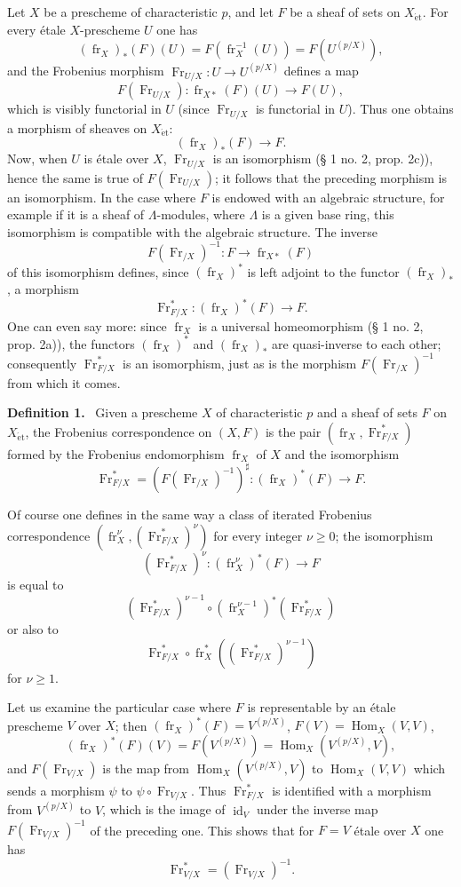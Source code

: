 \documentclass[11pt]{article}
\newenvironment{statement}[1]{\par\medskip\noindent\textbf{#1.}\ }{\par\medskip}
\DeclareMathOperator{\Hom}{Hom}
\providecommand{\et}{\mathrm{\acute{e}t}}
\providecommand{\id}{\operatorname{id}}
\providecommand{\Hom}{\operatorname{Hom}}
\providecommand{\id}{\operatorname{id}}
\providecommand{\id}{\operatorname{id}}
\providecommand{\id}{\operatorname{id}}
\providecommand{\id}{\operatorname{id}}
\providecommand{\Hom}{\operatorname{Hom}}
\providecommand{\fr}{\operatorname{fr}}
\providecommand{\Fr}{\operatorname{Fr}}
\providecommand{\Fr}{\operatorname{Fr}}
\providecommand{\fr}{\operatorname{fr}}
\providecommand{\id}{\operatorname{id}}
\providecommand{\et}{\acute{e}t}
\begin{document}
Let $X$ be a prescheme of characteristic $p$, and let $F$ be a sheaf of sets on $X_{\et}$. For every étale $X$-prescheme $U$ one has
\[
(\fr_X)_*(F)(U)=F(\fr_X^{-1}(U))=F(U^{(p/X)}),
\]
and the Frobenius morphism $\Fr_{U/X}:U\to U^{(p/X)}$ defines a map
\[
F(\Fr_{U/X}):\fr_{X*}(F)(U)\longrightarrow F(U),
\]
which is visibly functorial in $U$ (since $\Fr_{U/X}$ is functorial in $U$). Thus one obtains a morphism of sheaves on $X_{\et}$:
\[
(\fr_X)_*(F)\longrightarrow F.
\]
Now, when $U$ is étale over $X$, $\Fr_{U/X}$ is an isomorphism (§ 1 no. 2, prop. 2c)), hence the same is true of $F(\Fr_{U/X})$; it follows that the preceding morphism is an isomorphism. In the case where $F$ is endowed with an algebraic structure, for example if it is a sheaf of $\Lambda$-modules, where $\Lambda$ is a given base ring, this isomorphism is compatible with the algebraic structure. The inverse
\[
F(\Fr_{/X})^{-1}:F\longrightarrow \fr_{X*}(F)
\]
of this isomorphism defines, since $(\fr_X)^*$ is left adjoint to the functor $(\fr_X)_*$, a morphism
\[
\Fr^*_{F/X}:(\fr_X)^*(F)\longrightarrow F.
\]
One can even say more: since $\fr_X$ is a universal homeomorphism (§ 1 no. 2, prop. 2a)), the functors $(\fr_X)^*$ and $(\fr_X)_*$ are quasi-inverse to each other; consequently $\Fr^*_{F/X}$ is an isomorphism, just as is the morphism $F(\Fr_{/X})^{-1}$ from which it comes.

\begin{statement}{Definition 1}
Given a prescheme $X$ of characteristic $p$ and a sheaf of sets $F$ on $X_{\et}$, the Frobenius correspondence on $(X,F)$ is the pair $(\fr_X,\Fr^*_{F/X})$ formed by the Frobenius endomorphism $\fr_X$ of $X$ and the isomorphism
\[
\Fr^*_{F/X}=(F(\Fr_{/X})^{-1})^\sharp:(\fr_X)^*(F)\longrightarrow F.
\]
\end{statement}

Of course one defines in the same way a class of iterated Frobenius correspondence $(\fr_X^\nu,(\Fr^*_{F/X})^\nu)$ for every integer $\nu\geq0$; the isomorphism
\[
(\Fr^*_{F/X})^\nu:(\fr_X^\nu)^*(F)\longrightarrow F
\]
is equal to
\[
(\Fr^*_{F/X})^{\nu-1}\circ (\fr_X^{\nu-1})^*(\Fr^*_{F/X})
\]
or also to
\[
\Fr^*_{F/X}\circ\fr_X^*((\Fr^*_{F/X})^{\nu-1})
\]
for $\nu\geq1$.

Let us examine the particular case where $F$ is representable by an étale prescheme $V$ over $X$; then $(\fr_X)^*(F)=V^{(p/X)}$, $F(V)=\Hom_X(V,V)$,
\[
(\fr_X)^*(F)(V)=F(V^{(p/X)})=\Hom_X(V^{(p/X)},V),
\]
and $F(\Fr_{V/X})$ is the map from $\Hom_X(V^{(p/X)},V)$ to $\Hom_X(V,V)$ which sends a morphism $\psi$ to $\psi\circ\Fr_{V/X}$. Thus $\Fr^*_{F/X}$ is identified with a morphism from $V^{(p/X)}$ to $V$, which is the image of $\id_V$ under the inverse map $F(\Fr_{V/X})^{-1}$ of the preceding one. This shows that for $F=V$ étale over $X$ one has
\[
\Fr^*_{V/X}=(\Fr_{V/X})^{-1}.
\]
\end{document}
